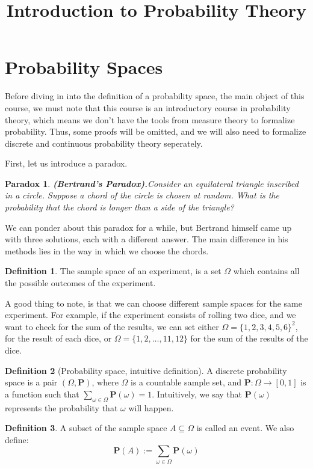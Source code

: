 \documentclass[11pt,a4paper]{article}
\title{\textbf{Introduction to Probability Theory}}
\author{}
\date{}
\theoremstyle{definition}
\newtheorem{definition}{Definition}[section]
\theoremstyle{plain}
\newtheorem{paradox}{Paradox}[section]
\renewcommand{\tt}[1]{\textnormal{\textbf{(#1).}}} %
\begin{document}
	\maketitle
	\newpage
  \section{Probability Spaces}
  Before diving in into the definition of a probability space, the main object
  of this course, we must note that this course is an introductory course in 
  probability theory, which means we don't have the tools from measure theory
  to formalize probability. Thus, some proofs will be omitted, and we will
  also need to formalize discrete and continuous probability theory seperately.

  First, let us introduce a paradox.
  \begin{paradox}
    \tt{Bertrand's Paradox}\label{par:ber}
    Consider an equilateral triangle inscribed in a circle. 
    Suppose a chord of the circle is chosen at random. 
    What is the probability that the chord is longer than a side of the 
    triangle? 
  \end{paradox}

  We can ponder about this paradox for a while, but Bertrand himself came up
  with three solutions, each with a different answer. The main difference in
  his methods lies in the way in which we choose the chords.

  \begin{definition}
    The sample space of an experiment, is a set $\Omega$ which contains all
    the possible outcomes of the experiment.
  \end{definition}

  A good thing to note, is that we can choose different sample spaces for the
  same experiment. For example, if the experiment consists of rolling two
  dice, and we want to check for the sum of the results, we can set either
  $\Omega = \{1,2,3,4,5,6\}^2$, for the result of each dice, or 
  $\Omega = \{1,2,\dots,11,12\}$ for the sum of the results of the dice. 

  \begin{definition}[Probability space, intuitive definition]
    A discrete probability space is a pair $(\Omega, \mathbf P)$, where
    $\Omega$ is a countable sample set, and $\mathbf P \colon \Omega \to 
    [0,1]$ is a function such that 
    $\sum_{\omega \in \Omega}{\mathbf P(\omega)} = 1$. 
    Intuitively, we say that $\mathbf P(\omega)$ represents the probability
    that $\omega$ will happen.
  \end{definition}
  \begin{definition}
    A subset of the sample space $A \subseteq \Omega$ is called an event.
    We also define:
    \[
      \mathbf P(A) := \sum_{\omega \in \Omega}{\mathbf P(\omega)}
    \]
  \end{definition}
  
\end{document}
